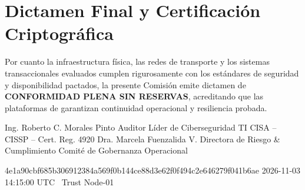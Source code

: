 \documentclass[11pt,letterpaper]{article}
\begin{document}
\section{Dictamen Final y Certificaci\'on Criptogr\'afica}

Por cuanto la infraestructura f\'isica, las redes de transporte y los sistemas transaccionales evaluados cumplen rigurosamente con los est\'andares de seguridad y disponibilidad pactados, la presente Comisi\'on emite dictamen de \textbf{CONFORMIDAD PLENA SIN RESERVAS}, acreditando que las plataformas de \textbf{\corporatebrandlegal} garantizan continuidad operacional y resiliencia probada.

\dualcontrolsignature
  {Ing. Roberto C. Morales Pinto}
  {Auditor L\'ider de Ciberseguridad TI}
  {CISA -- CISSP -- Cert. Reg. 4920}
  {Dra. Marcela Fuenzalida V.}
  {Directora de Riesgo \& Cumplimiento}
  {Comit\'e de Gobernanza Operacional}

\vspace{1.2em}

\cryptoseal
  {4e1a90cbf685b306912384a569f0b144ce88d3e62f0f494c2e646279f041b6ae}
  {2026-11-03 14:15:00 UTC}
  {\corporatebrandname\ Trust Node-01}
\end{document}
